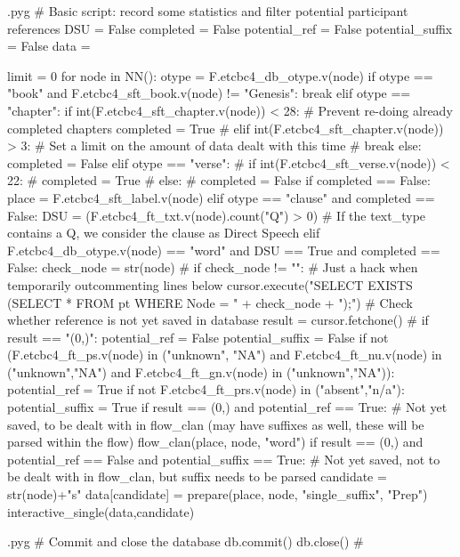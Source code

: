 \documentclass{report}
\makeatletter
\newenvironment{python}{%
  \VerbatimEnvironment
  \minted@resetoptions
  \setkeys{minted@opt}{}
      \begin{VerbatimOut}{\jobname.pyg}}
{%
      \end{VerbatimOut}
      \minted@pygmentize{python}
      \DeleteFile{\jobname.pyg}}
\makeatother
\begin{document}
\begin{python}
# Basic script: record some statistics and filter potential participant references
DSU = False
completed = False
potential_ref = False
potential_suffix = False
data = {}

limit = 0
for node in NN():
    otype = F.etcbc4_db_otype.v(node)
    if otype == "book" and F.etcbc4_sft_book.v(node) != "Genesis":
        break
    elif otype == "chapter":
        if int(F.etcbc4_sft_chapter.v(node)) < 28:    # Prevent re-doing already completed chapters
            completed = True
#        elif int(F.etcbc4_sft_chapter.v(node)) > 3:    # Set a limit on the amount of data dealt with this time
#            break
        else:
            completed = False 
    elif otype == "verse":
#        if int(F.etcbc4_sft_verse.v(node)) < 22:
#           completed = True
#        else:
#           completed = False
        if completed == False:
            place = F.etcbc4_sft_label.v(node)
    elif otype == "clause" and completed == False:
        DSU = (F.etcbc4_ft_txt.v(node).count("Q") > 0)    # If the text_type contains a Q, we consider the clause as Direct Speech
    elif F.etcbc4_db_otype.v(node) == "word" and DSU == True and completed == False:
        check_node = str(node)
#        if check_node != "":     # Just a hack when temporarily outcommenting lines below
        cursor.execute("SELECT EXISTS (SELECT * FROM pt WHERE Node = " + check_node + ");") # Check whether reference is not yet saved in database
        result = cursor.fetchone()
#        if result == "(0,)":
        potential_ref = False
        potential_suffix = False
        if not (F.etcbc4_ft_ps.v(node) in ("unknown", "NA") and F.etcbc4_ft_nu.v(node) in ("unknown","NA") and F.etcbc4_ft_gn.v(node) in ("unknown","NA")):
            potential_ref = True
        if not F.etcbc4_ft_prs.v(node) in ("absent","n/a"):
            potential_suffix = True
        if result == (0,) and potential_ref == True: # Not yet saved, to be dealt with in flow_clan (may have suffixes as well, these will be parsed within the flow)
            flow_clan(place, node, "word")
        if result == (0,) and potential_ref == False and potential_suffix == True: # Not yet saved, not to be dealt with in flow_clan, but suffix needs to be parsed
            candidate = str(node)+"s"
            data[candidate] = prepare(place, node, "single_suffix", "Prep")
            interactive_single(data,candidate)

\end{python}

\begin{python}
#{{{ Commit and close the database
db.commit()
db.close()
#}}}
\end{python}
\end{document}
